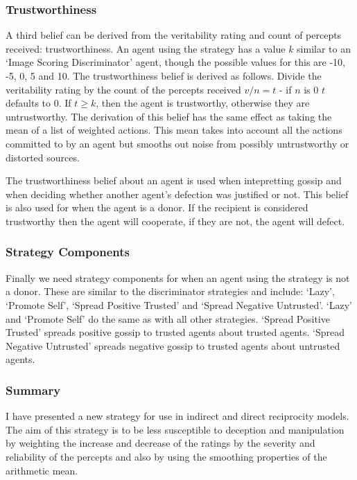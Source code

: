 \documentclass[]{final_report}
\begin{document}
\subsubsection{Trustworthiness}
A third belief can be derived from the veritability rating and count of percepts received: trustworthiness. An agent using the strategy has a value $k$ similar to an `Image Scoring Discriminator' agent, though the possible values for this are -10, -5, 0, 5 and 10. The trustworthiness belief is derived as follows. Divide the veritability rating by the count of the percepts received $v/n=t$ - if $n$ is 0 $t$ defaults to 0. If $t\ge k$, then the agent is trustworthy, otherwise they are untrustworthy.
The derivation of this belief has the same effect as taking the mean of a list of weighted actions. This mean takes into account all the actions committed to by an agent but smooths out noise from possibly untrustworthy or distorted sources.\par
The trustworthiness belief about an agent is used when intepretting gossip and when deciding whether another agent's defection was justified or not. This belief is also used for when the agent is a donor. If the recipient is considered trustworthy then the agent will cooperate, if they are not, the agent will defect.

\subsubsection{Strategy Components}
Finally we need strategy components for when an agent using the strategy is not a donor. These are similar to the discriminator strategies and include: `Lazy', `Promote Self', `Spread Positive Trusted' and `Spread Negative Untrusted'. `Lazy' and `Promote Self' do the same as with all other strategies. `Spread Positive Trusted' spreads positive gossip to trusted agents about trusted agents. `Spread Negative Untrusted' spreads negative gossip to trusted agents about untrusted agents.\par


\subsubsection{Summary}
I have presented a new strategy for use in indirect and direct reciprocity models. The aim of this strategy is to be less susceptible to deception and manipulation by weighting the increase and decrease of the ratings by the severity and reliability of the percepts and also by using the smoothing properties of the arithmetic mean. 
\end{document}
